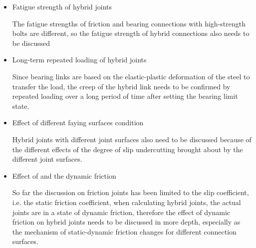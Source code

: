\begin{itemize}

\renewcommand\labelitemi{\faSearch}

\item Fatigue strength of hybrid joints

The fatigue strengths of friction and bearing connections with high-strength bolts are different, so the fatigue strength of hybrid connections also needs to be discussed

\item Long-term repeated loading of hybrid joints

Since bearing links are based on the elastic-plastic deformation of the steel to transfer the load, the creep of the hybrid link needs to be confirmed by repeated loading over a long period of time after setting the bearing limit state.

\item Effect of different faying surfaces condition

Hybrid joints with different joint surfaces also need to be discussed because of the different effects of the degree of slip undercutting brought about by the different joint surfaces.

\item Effect of and the dynamic friction

So far the discussion on friction joints has been limited to the slip coefficient, i.e. the static friction coefficient, when calculating hybrid joints, the actual joints are in a state of dynamic friction, therefore the effect of dynamic friction on hybrid joints needs to be discussed in more depth, especially as the mechanism of static-dynamic friction changes for different connection surfaces.
    
\end{itemize}
